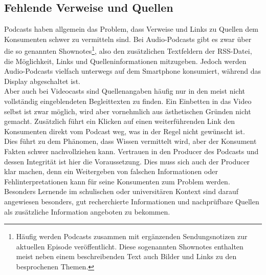 \documentclass[11pt,a4paper]{scrreprt}
\begin{document}
\subsection{Fehlende Verweise und Quellen}
Podcasts haben allgemein das Problem, dass Verweise und Links zu Quellen dem Konsumenten schwer zu vermitteln sind. Bei Audio-Podcasts gibt es zwar über die so genannten Shownotes\footnote{Häufig werden Podcasts zusammen mit ergänzenden Sendungsnotizen zur aktuellen Episode veröffentlicht. Diese sogenannten Shownotes enthalten meist neben einem beschreibenden Text auch Bilder und Links zu den besprochenen Themen.}, also den zusätzlichen Textfeldern der \ac{RSS}-Datei, die Möglichkeit, Links und Quelleninformationen mitzugeben. Jedoch werden Audio-Podcasts vielfach unterwegs auf dem Smartphone konsumiert, während das Display abgeschaltet ist.\\ Aber auch bei Videocasts sind Quellenangaben häufig nur in den meist nicht vollständig eingeblendeten Begleittexten zu finden. Ein Einbetten in das Video selbst ist zwar möglich, wird aber vornehmlich aus ästhetischen Gründen nicht gemacht. Zusätzlich führt ein Klicken auf einen weiterführenden Link den Konsumenten direkt vom Podcast weg, was in der Regel nicht gewünscht ist.\\
Dies führt zu dem Phänomen, dass Wissen vermittelt wird, aber der Konsument Fakten schwer nachvollziehen kann. Vertrauen in den Producer des Podcasts und dessen Integrität ist hier die Voraussetzung. Dies muss sich auch der Producer klar machen, denn ein Weitergeben von falschen Informationen oder Fehlinterpretationen kann für seine Konsumenten zum Problem werden. Besonders Lernende im schulischen oder universitären Kontext sind darauf angewiesen besonders, gut recherchierte Informationen und nachprüfbare Quellen als zusätzliche Information angeboten zu bekommen.
\end{document}
